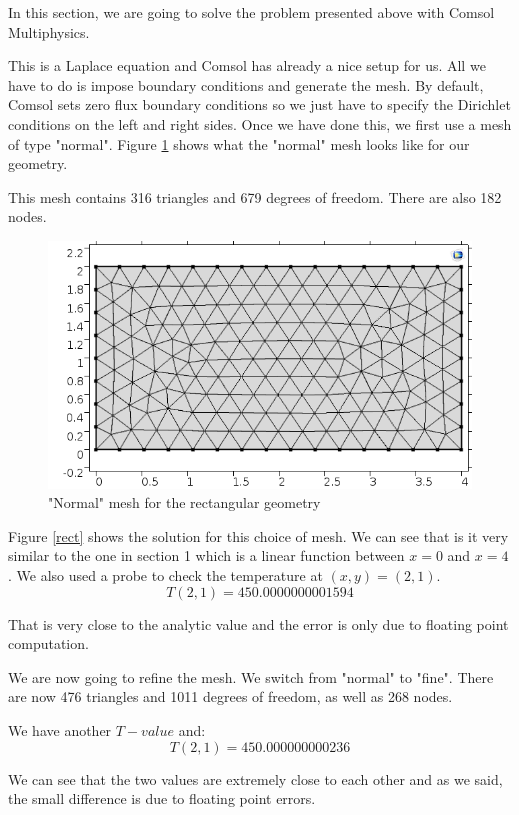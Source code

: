 In this section, we are going to solve the problem presented above with Comsol Multiphysics.

This is a Laplace equation and Comsol has already a nice setup for us. All we have to do is impose boundary conditions and generate the mesh. By default, Comsol sets zero flux boundary conditions so we just have to specify the Dirichlet conditions on the left and right sides. Once we have done this, we first use a mesh of type "normal". Figure \ref{mesh} shows what the "normal" mesh looks like for our geometry.

This mesh contains 316 triangles and 679 degrees of freedom. There are also 182 nodes.

\begin{figure}
\begin{center}
\includegraphics[scale=0.6]{laplaceMesh.png}
\caption{"Normal" mesh for the rectangular geometry}
\label{mesh}
\end{center}
\end{figure}

Figure \ref{rect} shows the solution for this choice of mesh. We can see that is it very similar to the one in section 1 which is a linear function between $x=0$ and $x=4$. We also used a probe to check the temperature at $(x,y)=(2,1)$.
$$T(2,1) = 450.0000000001594$$

That is very close to the analytic value and the error is only due to floating point computation.

We are now going to refine the mesh. We switch from "normal" to "fine". There are now 476 triangles and 1011 degrees of freedom, as well as 268 nodes.

We have another $T-value$ and:
$$T(2,1) = 450.000000000236$$

We can see that the two values are extremely close to each other and as we said, the small difference is due to floating point errors.


